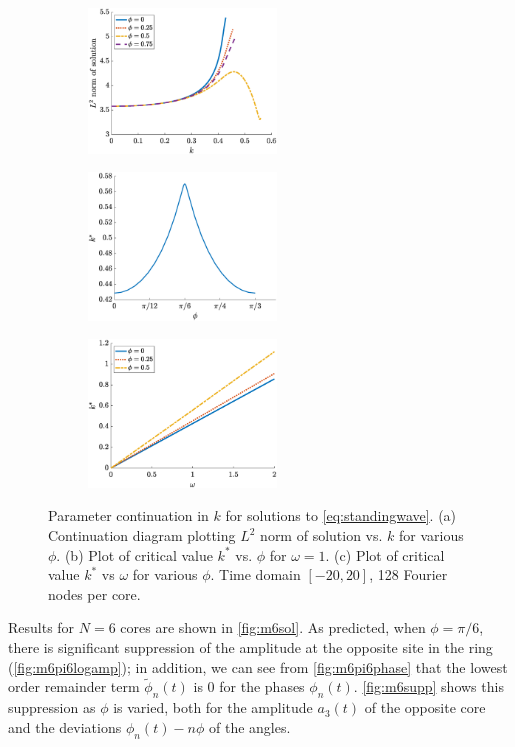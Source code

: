 \documentclass[11pt,reqno]{amsart}
\begin{document}
\begin{figure}
    \centering
    \begin{subfigure}{0.3\linewidth}
        \caption{}
        \label{fig:kcont2q}
        \includegraphics[width=5cm]{contkL2norm.eps}
    \end{subfigure}
    \begin{subfigure}{0.3\linewidth}
        \caption{}
        \label{fig:kcont2b}
        \includegraphics[width=5cm]{contkstarvsphi.eps}
    \end{subfigure}
    \begin{subfigure}{0.3\linewidth}
        \caption{}
        \label{fig:kcont2c}
        \includegraphics[width=5cm]{contkstarvsomega.eps}
    \end{subfigure}
    \caption{Parameter continuation in $k$ for solutions to \cref{eq:standingwave}. (a) Continuation diagram plotting $L^2$ norm of solution vs. $k$ for various $\phi$. (b) Plot of critical value $k^*$ vs. $\phi$ for $\omega = 1$. (c) Plot of critical value $k^*$ vs $\omega$ for various $\phi$. Time domain $[-20,20]$, 128 Fourier nodes per core.}
    \label{fig:kcont2}
\end{figure}

Results for $N=6$ cores are shown in \cref{fig:m6sol}. As predicted, when $\phi=\pi/6$, there is significant suppression of the amplitude at the opposite site in the ring (\cref{fig:m6pi6logamp}); in addition, we can see from \cref{fig:m6pi6phase} that the lowest order remainder term $\tilde{\phi}_n(t)$ is 0 for the phases $\phi_n(t)$. \cref{fig:m6supp} shows this suppression as $\phi$ is varied, both for the amplitude $a_3(t)$ of the opposite core and the deviations $\phi_n(t) - n \phi$ of the angles.
\end{document}
